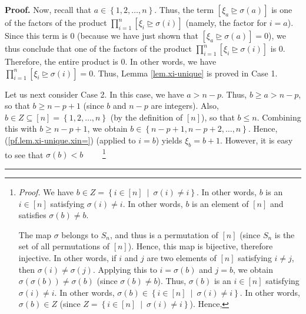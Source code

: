 \documentclass
[numbers=enddot,12pt,final,onecolumn,notitlepage,english]{scrartcl}%
\theoremstyle{definition}
\newenvironment{proof}[1][Proof]{\noindent\textbf{#1.} }{\ \rule{0.5em}{0.5em}}
\let\prodnonlimits\prod
\renewcommand{\prod}{\prodnonlimits\limits}
\newenvironment{verlong}{}{}
\begin{document}
\begin{verlong}
\begin{proof}
Now, recall that $a\in\left\{  1,2,\ldots,n\right\}  $. Thus, the term
$\left[  \xi_{a}\trianglerighteq\sigma\left(  a\right)  \right]  $ is one of
the factors of the product $\prod_{i=1}^{n}\left[  \xi_{i}\trianglerighteq
\sigma\left(  i\right)  \right]  $ (namely, the factor for $i=a$). Since this
term is $0$ (because we have just shown that $\left[  \xi_{a}\trianglerighteq
\sigma\left(  a\right)  \right]  =0$), we thus conclude that one of the
factors of the product $\prod_{i=1}^{n}\left[  \xi_{i}\trianglerighteq
\sigma\left(  i\right)  \right]  $ is $0$. Therefore, the entire product is
$0$. In other words, we have $\prod_{i=1}^{n}\left[  \xi_{i}\trianglerighteq
\sigma\left(  i\right)  \right]  =0$. Thus, Lemma \ref{lem.xi-unique} is
proved in Case 1.

Let us next consider Case 2. In this case, we have $a>n-p$. Thus, $b\geq
a>n-p$, so that $b\geq n-p+1$ (since $b$ and $n-p$ are integers). Also, $b\in
Z\subseteq\left[  n\right]  =\left\{  1,2,\ldots,n\right\}  $ (by the
definition of $\left[  n\right]  $), so that $b\leq n$. Combining this with
$b\geq n-p+1$, we obtain $b\in\left\{  n-p+1,n-p+2,\ldots,n\right\}  $. Hence,
(\ref{pf.lem.xi-unique.xin=}) (applied to $i=b$) yields $\xi_{b}=b+1$.
However, it is easy to see that $\sigma\left(  b\right)  <b$%
\ \ \ \ \footnote{\textit{Proof.} We have $b\in Z=\left\{  i\in\left[
n\right]  \ \mid\ \sigma\left(  i\right)  \neq i\right\}  $. In other words,
$b$ is an $i\in\left[  n\right]  $ satisfying $\sigma\left(  i\right)  \neq
i$. In other words, $b$ is an element of $\left[  n\right]  $ and satisfies
$\sigma\left(  b\right)  \neq b$.
\par
The map $\sigma$ belongs to $S_{n}$, and thus is a permutation of $\left[
n\right]  $ (since $S_{n}$ is the set of all permutations of $\left[
n\right]  $). Hence, this map is bijective, therefore injective. In other
words, if $i$ and $j$ are two elements of $\left[  n\right]  $ satisfying
$i\neq j$, then $\sigma\left(  i\right)  \neq\sigma\left(  j\right)  $.
Applying this to $i=\sigma\left(  b\right)  $ and $j=b$, we obtain
$\sigma\left(  \sigma\left(  b\right)  \right)  \neq\sigma\left(  b\right)  $
(since $\sigma\left(  b\right)  \neq b$). Thus, $\sigma\left(  b\right)  $ is
an $i\in\left[  n\right]  $ satisfying $\sigma\left(  i\right)  \neq i$. In
other words, $\sigma\left(  b\right)  \in\left\{  i\in\left[  n\right]
\ \mid\ \sigma\left(  i\right)  \neq i\right\}  $. In other words,
$\sigma\left(  b\right)  \in Z$ (since $Z=\left\{  i\in\left[  n\right]
\ \mid\ \sigma\left(  i\right)  \neq i\right\}  $). Hence,
}
\end{proof}
\end{verlong}
\end{document}
